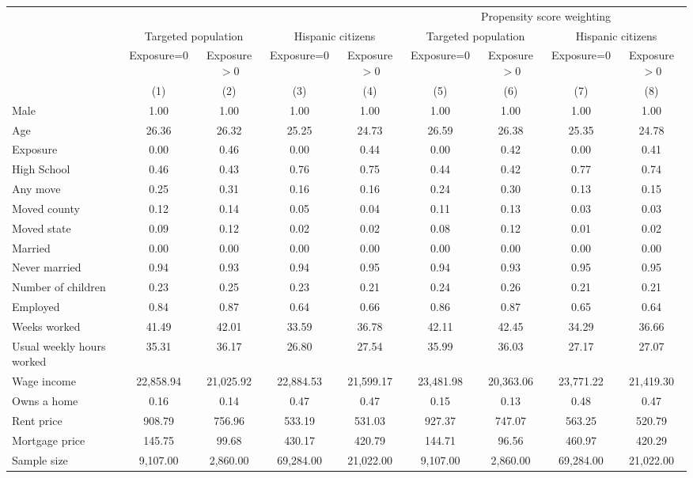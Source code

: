 \begin{tabular}{lcccccccc}
\toprule
\toprule
 & & & & & \multicolumn{4}{c}{Propensity score weighting} \\
 & \multicolumn{2}{c}{Targeted population} & \multicolumn{2}{c}{Hispanic citizens} & \multicolumn{2}{c}{Targeted population} & \multicolumn{2}{c}{Hispanic citizens}  \\
 & Exposure=0 & Exposure$>$0 & Exposure=0 & Exposure$>$0 & Exposure=0 & Exposure$>$0 & Exposure=0 & Exposure$>$0 \\
 & (1) & (2) & (3) & (4) & (5) & (6) & (7) & (8) \\
\midrule 
 Male  & 1.00 & 1.00 & 1.00 & 1.00 & 1.00 & 1.00 & 1.00 & 1.00\\
 Age  & 26.36 & 26.32 & 25.25 & 24.73 & 26.59 & 26.38 & 25.35 & 24.78\\
 Exposure  & 0.00 & 0.46 & 0.00 & 0.44 & 0.00 & 0.42 & 0.00 & 0.41\\
 High School  & 0.46 & 0.43 & 0.76 & 0.75 & 0.44 & 0.42 & 0.77 & 0.74\\
 Any move  & 0.25 & 0.31 & 0.16 & 0.16 & 0.24 & 0.30 & 0.13 & 0.15\\
 Moved county  & 0.12 & 0.14 & 0.05 & 0.04 & 0.11 & 0.13 & 0.03 & 0.03\\
 Moved state  & 0.09 & 0.12 & 0.02 & 0.02 & 0.08 & 0.12 & 0.01 & 0.02\\
 Married  & 0.00 & 0.00 & 0.00 & 0.00 & 0.00 & 0.00 & 0.00 & 0.00\\
 Never married  & 0.94 & 0.93 & 0.94 & 0.95 & 0.94 & 0.93 & 0.95 & 0.95\\
 Number of children  & 0.23 & 0.25 & 0.23 & 0.21 & 0.24 & 0.26 & 0.21 & 0.21\\
 Employed  & 0.84 & 0.87 & 0.64 & 0.66 & 0.86 & 0.87 & 0.65 & 0.64\\
 Weeks worked  & 41.49 & 42.01 & 33.59 & 36.78 & 42.11 & 42.45 & 34.29 & 36.66\\
 Usual weekly hours worked  & 35.31 & 36.17 & 26.80 & 27.54 & 35.99 & 36.03 & 27.17 & 27.07\\
 Wage income  & 22,858.94 & 21,025.92 & 22,884.53 & 21,599.17 & 23,481.98 & 20,363.06 & 23,771.22 & 21,419.30\\
 Owns a home  & 0.16 & 0.14 & 0.47 & 0.47 & 0.15 & 0.13 & 0.48 & 0.47\\
 Rent price  & 908.79 & 756.96 & 533.19 & 531.03 & 927.37 & 747.07 & 563.25 & 520.79\\
 Mortgage price  & 145.75 & 99.68 & 430.17 & 420.79 & 144.71 & 96.56 & 460.97 & 420.29\\
 Sample size  & 9,107.00 & 2,860.00 & 69,284.00 & 21,022.00 & 9,107.00 & 2,860.00 & 69,284.00 & 21,022.00\\
\bottomrule
\bottomrule
\end{tabular}
